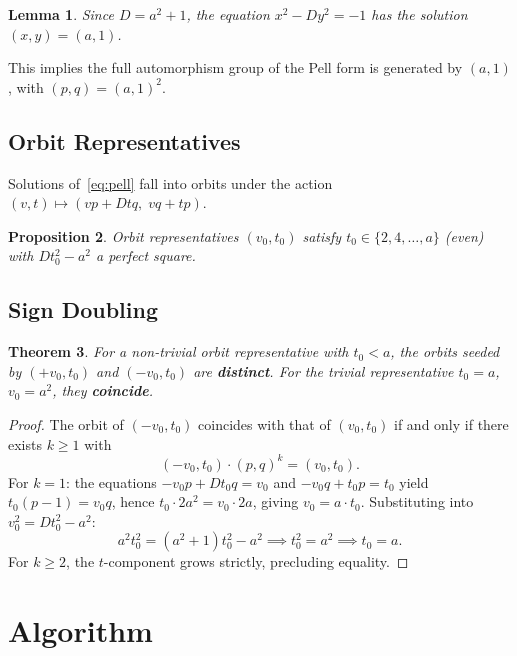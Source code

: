 \documentclass[11pt]{article}
\newtheorem{theorem}{Theorem}
\newtheorem{lemma}[theorem]{Lemma}
\newtheorem{proposition}[theorem]{Proposition}
\begin{document}
\begin{lemma}
Since $D = a^2+1$, the equation $x^2 - Dy^2 = -1$ has the solution
$(x,y) = (a, 1)$.
\end{lemma}

This implies the full automorphism group of the Pell form is generated by
$(a, 1)$, with $(p, q) = (a,1)^2$.

\subsection{Orbit Representatives}

Solutions of~\eqref{eq:pell} fall into orbits under the action
$(v, t) \mapsto (vp + Dtq,\; vq + tp)$.

\begin{proposition}
Orbit representatives $(v_0, t_0)$ satisfy $t_0 \in \{2, 4, \ldots, a\}$
(even) with $Dt_0^2 - a^2$ a perfect square.
\end{proposition}

\subsection{Sign Doubling}

\begin{theorem}\label{thm:sign}
For a non-trivial orbit representative with $t_0 < a$, the orbits seeded by
$(+v_0, t_0)$ and $(-v_0, t_0)$ are \textbf{distinct}. For the trivial
representative $t_0 = a$, $v_0 = a^2$, they \textbf{coincide}.
\end{theorem}

\begin{proof}
The orbit of $(-v_0, t_0)$ coincides with that of $(v_0, t_0)$ if and only
if there exists $k \ge 1$ with
\[
  (-v_0, t_0) \cdot (p, q)^k = (v_0, t_0).
\]
For $k = 1$: the equations $-v_0 p + Dt_0 q = v_0$ and $-v_0 q + t_0 p = t_0$
yield $t_0(p-1) = v_0 q$, hence $t_0 \cdot 2a^2 = v_0 \cdot 2a$, giving
$v_0 = a \cdot t_0$. Substituting into $v_0^2 = Dt_0^2 - a^2$:
\[
  a^2 t_0^2 = (a^2+1)t_0^2 - a^2 \implies t_0^2 = a^2 \implies t_0 = a.
\]
For $k \ge 2$, the $t$-component grows strictly, precluding equality.
\end{proof}

\section{Algorithm}
\end{document}
